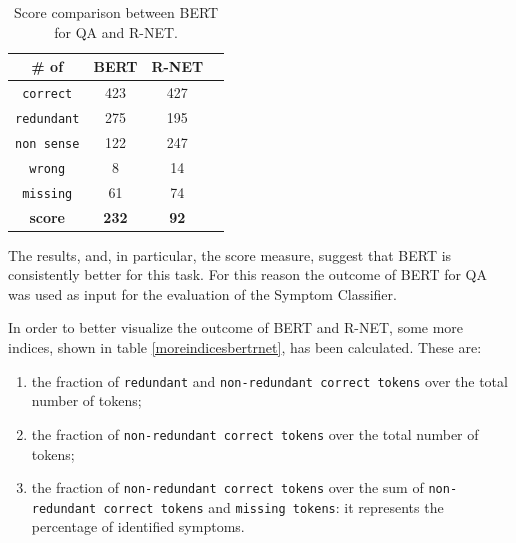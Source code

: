 \begin{center}
  \begin{table}
     \begin{tabular}{| c | c | c | c |} 
     \hline
     \# of & BERT & R-NET \\ [0.5ex] 
     \hline\hline
     \rowcolor{green}
     \texttt{correct} & 423 & 427 \\ 
     \hline
     \rowcolor{lightgreen}
     \texttt{redundant} & 275 & 195 \\
     \hline
     \rowcolor{red}
     \texttt{non sense} & 122 & 247 \\
     \hline
     \rowcolor{red}
     \texttt{wrong} & 8 & 14 \\
     \hline
     \rowcolor{red}
     \texttt{missing} & 61 & 74 \\
     \hline
     \textbf{score} & \textbf{232} & \textbf{92} \\ 
     \hline
    \end{tabular}
 \caption{\label{tab:bertrnet} Score comparison between BERT for QA and R-NET.}
 \end{table}
\end{center}

The results, and, in particular, the score measure, suggest that BERT is consistently better for this task. For this reason the outcome of BERT for QA was used as input for the evaluation of the Symptom Classifier.

In order to better visualize the outcome of BERT and R-NET, some more indices, shown in table \ref{moreindicesbertrnet}, has been calculated. These are:
\begin{enumerate}
  \item the fraction of \texttt{redundant} and \texttt{non-redundant correct tokens} over the total number of tokens;
  \item the fraction of \texttt{non-redundant correct tokens} over the total number of tokens;
  \item the fraction of \texttt{non-redundant correct tokens} over the sum of \texttt{non-redundant correct tokens} and \texttt{missing tokens}: it represents the percentage of identified symptoms.
\end{enumerate}

